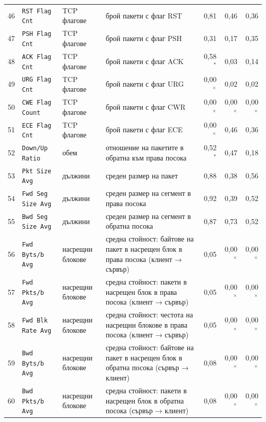 {{\begin{tabularx}{\textwidth}{@{}rl l Lrrr@{}}
46 & \texttt{RST Flag Cnt} & TCP флагове & брой пакети с флаг RST & 0,81 & 0,46 & 0,36\\
47 & \texttt{PSH Flag Cnt} & TCP флагове & брой пакети с флаг PSH & 0,31 & 0,17 & 0,35\\
48 & \texttt{ACK Flag Cnt} & TCP флагове & брой пакети с флаг ACK & 0,58$^{\ast}$ & 0,03 & 0,14\\
49 & \texttt{URG Flag Cnt} & TCP флагове & брой пакети с флаг URG & 0,00$^{\times}$ & 0,02 & 0,02\\
50 & \texttt{CWE Flag Count} & TCP флагове & брой пакети с флаг CWR & 0,00$^{\times}$ & 0,00$^{\times}$ & 0,00$^{\times}$\\
51 & \texttt{ECE Flag Cnt} & TCP флагове & брой пакети с флаг ECE & 0,00$^{\times}$ & 0,46 & 0,36\\
52 & \texttt{Down/Up Ratio} & обем & отношение на пакетите в обратна към права посока & 0,52$^{\ast}$ & 0,47 & 0,18\\
53 & \texttt{Pkt Size Avg} & дължини & среден размер на пакет & 0,88 & 0,38 & 0,56\\
54 & \texttt{Fwd Seg Size Avg} & дължини & среден размер на сегмент в права посока & 0,92 & 0,39 & 0,52\\
55 & \texttt{Bwd Seg Size Avg} & дължини & среден размер на сегмент в обратна посока & 0,87 & 0,73 & 0,52\\
56 & \texttt{Fwd Byts/b Avg} & насрещни блокове & средна стойност: байтове на пакет в насрещен блок в права посока (клиент → сървър) & 0,05 & 0,00$^{\times}$ & 0,00$^{\times}$\\
57 & \texttt{Fwd Pkts/b Avg} & насрещни блокове & средна стойност: пакети в насрещен блок в права посока (клиент → сървър) & 0,05 & 0,00$^{\times}$ & 0,00$^{\times}$\\
58 & \texttt{Fwd Blk Rate Avg} & насрещни блокове & средна стойност: честота на насрещни блокове в права посока (клиент → сървър) & 0,05 & 0,00$^{\times}$ & 0,00$^{\times}$\\
59 & \texttt{Bwd Byts/b Avg} & насрещни блокове & средна стойност: байтове на пакет в насрещен блок в обратна посока (сървър → клиент) & 0,08 & 0,00$^{\times}$ & 0,00$^{\times}$\\
60 & \texttt{Bwd Pkts/b Avg} & насрещни блокове & средна стойност: пакети в насрещен блок в обратна посока (сървър → клиент) & 0,08 & 0,00$^{\times}$ & 0,00$^{\times}$\\

\end{tabularx}}}
